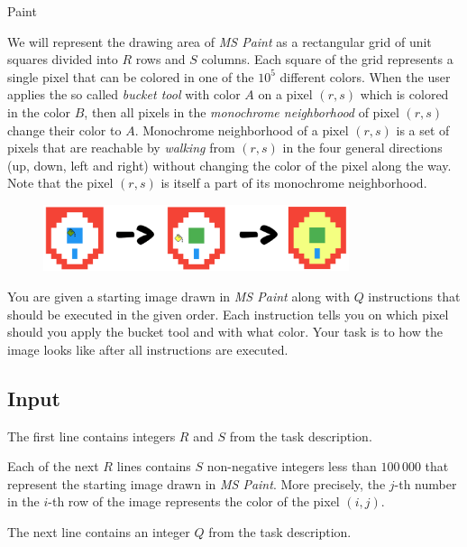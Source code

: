 \begin{statement}[
  problempoints=100,
  timelimit=3 seconds,
  memorylimit=512 MiB,
]{Paint}

We will represent the drawing area of \textit{MS Paint} as a rectangular
grid of unit squares divided into $R$ rows and $S$ columns. Each square of
the grid represents a single pixel that can be colored in one of the $10^5$
different colors. When the user applies the so called \textit{bucket tool} with
color $A$ on a pixel $(r, s)$ which is colored in the color $B$, then all pixels
in the \textit{monochrome neighborhood} of pixel $(r, s)$ change their color
to $A$. Monochrome neighborhood of a pixel $(r, s)$ is a set of pixels that
are reachable by \textit{walking} from $(r, s)$ in the four general directions
(up, down, left and right) without changing the color of the pixel along the
way. Note that the pixel $(r, s)$ is itself a part of its monochrome
neighborhood.

\begin{figure}[H]
\centering
\includegraphics[width=0.8\textwidth]{img/paint_skica.png}
\end{figure}

You are given a starting image drawn in \textit{MS Paint} along with $Q$
instructions that should be executed in the given order. Each instruction tells
you on which pixel should you apply the bucket tool and with what color. Your
task is to how the image looks like after all instructions are executed.

\subsection*{Input}
The first line contains integers $R$ and $S$ from the task description.

Each of the next $R$ lines contains $S$ non-negative integers less than
$100\,000$ that represent the starting image drawn in \textit{MS Paint}.
More precisely, the $j$-th number in the $i$-th row of the image represents
the color of the pixel $(i, j)$.

The next line contains an integer $Q$ from the task description.


\end{statement}
